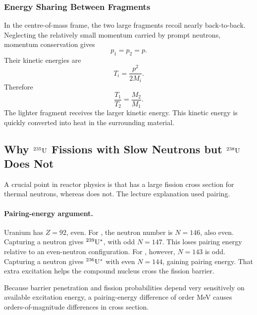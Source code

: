 \subsubsection*{Energy Sharing Between Fragments}
In the centre-of-mass frame, the two large fragments recoil nearly back-to-back.
Neglecting the relatively small momentum carried by prompt neutrons, momentum
conservation gives
\begin{equation}
  p_1=p_2=p.
\end{equation}
Their kinetic energies are
\begin{equation}
  T_i=\frac{p^2}{2M_i}.
\end{equation}
Therefore
\begin{equation}
  \boxed{\frac{T_1}{T_2}=\frac{M_2}{M_1}.}
  \label{eq:lec11:fission_energy_sharing}
\end{equation}
The lighter fragment receives the larger kinetic energy. This kinetic energy is
quickly converted into heat in the surrounding material.

\subsection{Why \texorpdfstring{$\nucleus{U}{235}$}{U-235} Fissions with Slow Neutrons but \texorpdfstring{$\nucleus{U}{238}$}{U-238} Does Not}
\label{subsec:lec11:u235_u238}

A crucial point in reactor physics is that  has a large fission
cross section for thermal neutrons, whereas  does not. The
lecture explanation used pairing.

\paragraph{Pairing-energy argument.}
Uranium has $Z=92$, even. For , the neutron number is
$N=146$, also even. Capturing a neutron gives $\nucleus{U}{239}^{\ast}$, with odd
$N=147$. This loses pairing energy relative to an even-neutron configuration.
For , however, $N=143$ is odd. Capturing a neutron gives
$\nucleus{U}{236}^{\ast}$ with even $N=144$, gaining pairing energy. That extra
excitation helps the compound nucleus cross the fission barrier.

Because barrier penetration and fission probabilities depend very sensitively on
available excitation energy, a pairing-energy difference of order MeV causes
orders-of-magnitude differences in cross section.

